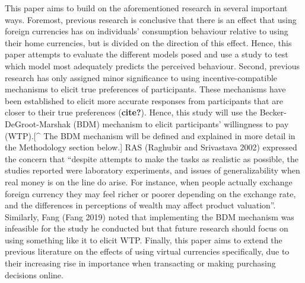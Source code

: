 \documentclass[
]{report}
\begin{document}
This paper aims to build on the aforementioned research in several
important ways. Foremost, previous research is conclusive that there is
an effect that using foreign currencies has on individuals' consumption
behaviour relative to using their home currencies, but is divided on the
direction of this effect. Hence, this paper attempts to evaluate the
different models posed and use a study to test which model most
adequately predicts the perceived behaviour. Second, previous research
has only assigned minor significance to using incentive-compatible
mechanisms to elicit true preferences of participants. These mechanisms
have been established to elicit more accurate responses from
participants that are closer to their true preferences (\textbf{cite?}).
Hence, this study will use the Becker-DeGroot-Marshak (BDM) mechanism to
elicit participants' willingness to pay (WTP).{[}\^{} The BDM mechanism
will be defined and explained in more detail in the Methodology section
below.{]} RAS (Raghubir and Srivastava 2002) expressed the concern that
``despite attempts to make the tasks as realistic as possible, the
studies reported were laboratory experiments, and issues of
generalizability when real money is on the line do arise. For instance,
when people actually exchange foreign currency they may feel richer or
poorer depending on the exchange rate, and the differences in
perceptions of wealth may affect product valuation''. Similarly, Fang
(Fang 2019) noted that implementing the BDM mechanism was infeasible for
the study he conducted but that future research should focus on using
something like it to elicit WTP. Finally, this paper aims to extend the
previous literature on the effects of using virtual currencies
specifically, due to their increasing rise in importance when
transacting or making purchasing decisions online.
\end{document}
